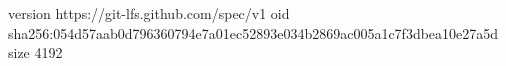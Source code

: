 version https://git-lfs.github.com/spec/v1
oid sha256:054d57aab0d796360794e7a01ec52893e034b2869ac005a1c7f3dbea10e27a5d
size 4192
